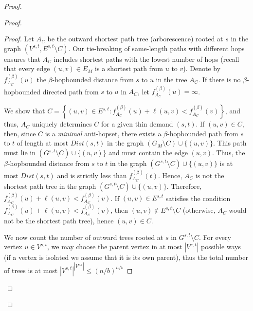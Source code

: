 \begin{proof}
\begin{proof}
\begin{proof}
            Let $A_C$ be the outward shortest path tree (arborescence) rooted at $s$ in the graph $(V^{s,t}, E^{s,t} \setminus C)$. Our tie-breaking of same-length paths with different hops ensures that $A_C$ includes shortest paths with the lowest number of hops (recall that every edge $(u,v) \in E_M$ is a shortest path from $u$ to $v$). 
            Denote by $f^{(\beta)}_{A_C}(u)$ the $\beta$-hopbounded distance from $s$ to $u$ in the tree $A_C$. If there is no $\beta$-hopbounded directed path from $s$ to $u$ in $A_C$, let $f^{(\beta)}_{A_C}(u) = \infty$. 
            
            We show that $C = \left\{ (u,v) \in E^{s,t} : f^{(\beta)}_{A_C}(u) + \ell(u,v) <  f^{(\beta)}_{A_C}(v) \right\}$, and thus, $A_C$ uniquely determines $C$ for a given thin demand $(s,t)$. If $(u,v) \in C$, then, since $C$ is a \textit{minimal} anti-hopset, there exists a $\beta$-hopbounded path from $s$ to $t$ of length at most $Dist(s,t)$ in the graph $(G_M \setminus C) \cup \{(u,v)\}$. This path must lie in $(G^{s,t} \setminus C) \cup \{(u,v)\}$ and must contain the edge $(u,v)$. Thus, the $\beta$-hopbounded distance from $s$ to $t$ in the graph $(G^{s,t} \setminus C) \cup \{(u,v)\}$ is at most $Dist(s,t)$ and is strictly less than $f^{(\beta)}_{A_C}(t)$. Hence, $A_C$ is not the shortest path tree in the graph $(G^{s,t} \setminus C) \cup \{(u,v)\}$. Therefore, $f^{(\beta)}_{A_C}(u) + \ell(u,v) <  f^{(\beta)}_{A_C}(v)$. If $(u,v) \in E^{s,t}$ satisfies the condition $f^{(\beta)}_{A_C}(u) + \ell(u,v) <  f^{(\beta)}_{A_C}(v)$, then $(u,v) \notin E^{s,t} \setminus C$ (otherwise, $A_C$ would not be the shortest path tree), hence $(u,v) \in C$.

            We now count the number of outward trees rooted at $s$ in $G^{s,t} \setminus C$. For every vertex $u \in V^{s,t}$, we may choose the parent vertex in at most $|V^{s,t}|$ possible ways (if a vertex is isolated we assume that it is its own parent), thus the total number of trees is at most $|V^{s,t}|^{|V^{s,t}|} \leq (n / b)^{n/b}$
        \end{proof}


\end{proof}
\end{proof}
